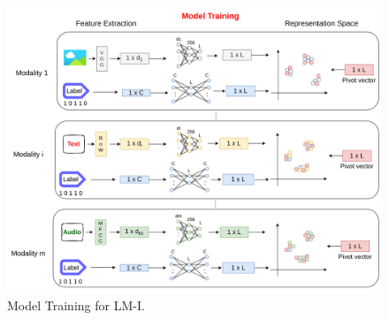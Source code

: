 \begin{figure}[htbp]
    \centering
    \includegraphics[width=\textwidth]{Figures/lmi.png}
    \caption{Model Training for LM-I.}
    \label{fig:lmi_training}
\end{figure}

